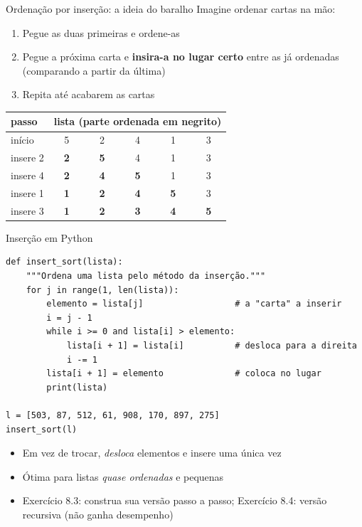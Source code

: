 \documentclass[aspectratio=169,10pt,t]{beamer}
\begin{document}
\begin{frame}{Ordenação por inserção: a ideia do baralho}
  Imagine ordenar cartas na mão:
  \begin{enumerate}
    \item Pegue as duas primeiras e ordene-as
    \item Pegue a próxima carta e \textbf{insira-a no lugar certo} entre as já ordenadas (comparando a partir da última)
    \item Repita até acabarem as cartas
  \end{enumerate}
  \vspace{1ex}
  \centering\small
  \begin{tabular}{lccccc}
    \toprule
    passo & \multicolumn{5}{c}{lista (parte ordenada em negrito)}\\
    \midrule
    início & 5 & 2 & 4 & 1 & 3\\
    insere 2 & \textbf{2} & \textbf{5} & 4 & 1 & 3\\
    insere 4 & \textbf{2} & \textbf{4} & \textbf{5} & 1 & 3\\
    insere 1 & \textbf{1} & \textbf{2} & \textbf{4} & \textbf{5} & 3\\
    insere 3 & \textbf{1} & \textbf{2} & \textbf{3} & \textbf{4} & \textbf{5}\\
    \bottomrule
  \end{tabular}
\end{frame}

\begin{frame}[fragile]{Inserção em Python}
\begin{lstlisting}[basicstyle=\ttfamily\scriptsize]
def insert_sort(lista):
    """Ordena uma lista pelo método da inserção."""
    for j in range(1, len(lista)):
        elemento = lista[j]                  # a "carta" a inserir
        i = j - 1
        while i >= 0 and lista[i] > elemento:
            lista[i + 1] = lista[i]          # desloca para a direita
            i -= 1
        lista[i + 1] = elemento              # coloca no lugar
        print(lista)

l = [503, 87, 512, 61, 908, 170, 897, 275]
insert_sort(l)
\end{lstlisting}
  \begin{itemize}
    \item Em vez de trocar, \emph{desloca} elementos e insere uma única vez
    \item Ótima para listas \emph{quase ordenadas} e pequenas
    \item Exercício 8.3: construa sua versão passo a passo; Exercício 8.4: versão recursiva (não ganha desempenho)
  \end{itemize}
\end{frame}
\end{document}
